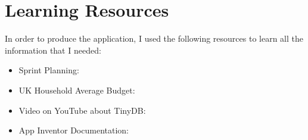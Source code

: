 \chapter{Learning Resources}
In order to produce the application, I used the following resources to learn all the information that I needed:
\begin{itemize}
  \item Sprint Planning: \cite{sprintPlanning}
  \item UK Household Average Budget: \cite{ukHouseholdBudget}
  \item Video on YouTube about TinyDB: \cite{tinyDBTuto}
  \item App Inventor Documentation: \cite{appInventorDocs}
\end{itemize}
